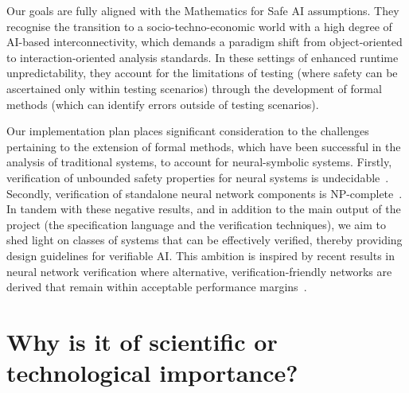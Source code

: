 \documentclass[11pt]{article}
\begin{document}
Our goals are fully aligned with the Mathematics for Safe AI
assumptions.  They recognise the transition to a
socio-techno-economic world with a high degree of AI-based
interconnectivity, which demands a paradigm shift from object-oriented
to interaction-oriented analysis standards. In
these settings of enhanced runtime unpredictability, they
account for the limitations of testing (where safety can be
ascertained only within testing scenarios) through the
development of formal methods (which can identify errors
outside of testing scenarios). 

Our implementation plan  places significant consideration to
the challenges  pertaining to the extension of formal
methods, which have been successful in the analysis of
traditional systems, to account for neural-symbolic systems.
Firstly, verification of unbounded safety properties for
neural systems is undecidable~\cite{Akintunde+20}. Secondly,
verification of standalone neural network components is
NP-complete~\cite{Katz+17}. In tandem with these negative
results, and in addition to the main output of the project
(the specification language and the verification
techniques), we aim to shed light on classes of systems that
can be effectively verified, thereby providing design
guidelines for verifiable AI. This ambition is inspired by
recent results in neural network verification where
alternative, verification-friendly networks are derived
that  remain within acceptable performance
margins~\cite{baninajjarvnn}.


  


\section{Why is it of scientific or technological importance?}
\end{document}
